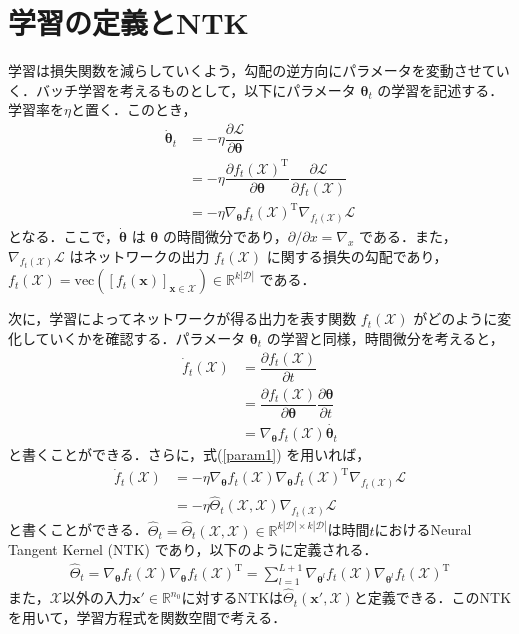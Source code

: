 \documentclass[a4paper]{bxjsarticle}
\theoremstyle{definition}
\begin{document}
\section{学習の定義とNTK}
\label{learning_def_NTK}
学習は損失関数を減らしていくよう，勾配の逆方向にパラメータを変動させていく．バッチ学習を考えるものとして，以下にパラメータ $\bm{\theta}_t$ の学習を記述する．学習率を$\eta$と置く．このとき，
\begin{align}
    \dot{\bm{\theta}}_t &= -\eta \dfrac{\partial \mathcal{L}}{\partial \bm{\theta}} \\
    &= -\eta \dfrac{\partial f_t(\mathcal{X})^{\mathrm{T}}}{\partial \bm{\theta}} \dfrac{\partial \mathcal{L}}{\partial f_t(\mathcal{X})} \\
    &= -\eta \nabla_{\bm{\theta}}f_t(\mathcal{X})^{\mathrm{T}}\nabla_{f_t(\mathcal{X})}\mathcal{L} \label{param1}
\end{align}
となる．ここで，$\dot{\bm{\theta}}$ は $\bm{\theta}$ の時間微分であり，$\partial/\partial x = \nabla_x$ である．また，$\nabla_{f_t(\mathcal{X})}\mathcal{L}$ はネットワークの出力 $f_t(\mathcal{X})$ に関する損失の勾配であり，$f_t(\mathcal{X}) = \mbox{vec}([f_t(\bm{x})]_{\bm{x} \in \mathcal{X}}) \in \mathbb{R}^{k|\mathcal{D}|}$ である．

次に，学習によってネットワークが得る出力を表す関数 $f_t(\mathcal{X})$ がどのように変化していくかを確認する．パラメータ $\bm{\theta}_t$ の学習と同様，時間微分を考えると，
\begin{align}
    \dot{f}_t(\mathcal{X}) &= \dfrac{\partial f_t(\mathcal{X})}{\partial t} \\
    &= \dfrac{\partial f_t(\mathcal{X})}{\partial \bm{\theta}} \dfrac{\partial \bm{\theta}}{\partial t} \\
    &= \nabla_{\bm{\theta}}f_t(\mathcal{X})\dot{\bm{\theta}_t}
\end{align}
と書くことができる．さらに，式(\ref{param1}) を用いれば，
\begin{align}
    \dot{f}_t(\mathcal{X}) &= -\eta\nabla_{\bm{\theta}}f_t(\mathcal{X})\nabla_{\bm{\theta}}f_t(\mathcal{X})^{\mathrm{T}}\nabla_{f_t(\mathcal{X})}\mathcal{L} \\
    &= -\eta\hat{\Theta}_t(\mathcal{X}, \mathcal{X})\nabla_{f_t(\mathcal{X})}\mathcal{L} \label{func_learning}
\end{align}
と書くことができる．$\hat{\Theta}_t = \hat{\Theta}_t(\mathcal{X}, \mathcal{X}) \in \mathbb{R}^{k|\mathcal{D}| \times k|\mathcal{D}|}$は時間$t$におけるNeural Tangent Kernel (NTK) であり，以下のように定義される．
\begin{align}
    \hat{\Theta}_t = \nabla_{\bm{\theta}}f_t(\mathcal{X})\nabla_{\bm{\theta}}f_t(\mathcal{X})^{\mathrm{T}} = \sum_{l=1}^{L+1} \nabla_{\bm{\theta}^l}f_t(\mathcal{X})\nabla_{\bm{\theta}^l}f_t(\mathcal{X})^{\mathrm{T}}
\end{align}
また，$\mathcal{X}$以外の入力$\bm{x}' \in \mathbb{R}^{n_0}$に対するNTKは$\hat{\Theta}_t(\bm{x}', \mathcal{X})$と定義できる．このNTKを用いて，学習方程式を関数空間で考える．
\end{document}
